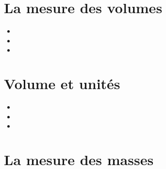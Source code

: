 \documentclass[12pt,a4paper]{article}
\date{}
\title{}
\begin{document}
	
	

\section{La mesure des volumes}








\begin{myexos}
	\begin{itemize}
		\item {}
		\item {}
		\item {}
	\end{itemize}
\end{myexos}

\section{Volume et unités}





\begin{myexos}
	\begin{multicols}{2}
	
		\begin{itemize}
			\item {}
			\item {}
			\item {}
		\end{itemize}
	
	\end{multicols}
\end{myexos}


\section{La mesure des masses}





\begin{myexos}
\end{myexos}
\end{document}
